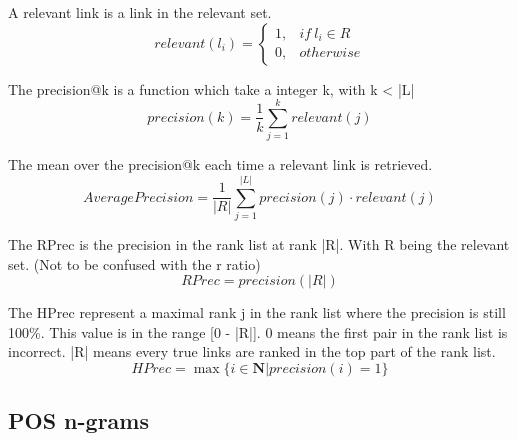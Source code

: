 \begin{definition}
  A relevant link is a link in the relevant set.
  \begin{equation}
    relevant(l_i) =
    \begin{cases}
      1, & if\ l_i \in R \\
      0, & otherwise
    \end{cases}
  \end{equation}
\end{definition}

\begin{definition}
  The precision@k is a function which take a integer k, with k < |L|
  \begin{equation}
    precision(k) = \frac{1}{k} \sum_{j=1}^{k} relevant(j)
  \end{equation}
\end{definition}

\begin{definition}
  The mean over the precision@k each time a relevant link is retrieved.
  \begin{equation}
    AveragePrecision = \frac{1}{|R|} \sum_{j=1}^{|L|} precision(j) \cdot relevant(j)
  \end{equation}
\end{definition}

\begin{definition}
  The RPrec is the precision in the rank list at rank |R|.
  With R being the relevant set. (Not to be confused with the r ratio)
  \begin{equation}
    RPrec = precision(|R|)
  \end{equation}
\end{definition}

\begin{definition}
  The HPrec represent a maximal rank j in the rank list where the precision is still 100\%.
  This value is in the range [0 - |R|].
  0 means the first pair in the rank list is incorrect.
  |R| means every true links are ranked in the top part of the rank list.
  \begin{equation}
    HPrec = \max\{i \in \mathbf{N} | precision(i) = 1\}
  \end{equation}
\end{definition}


\subsection{POS n-grams}

